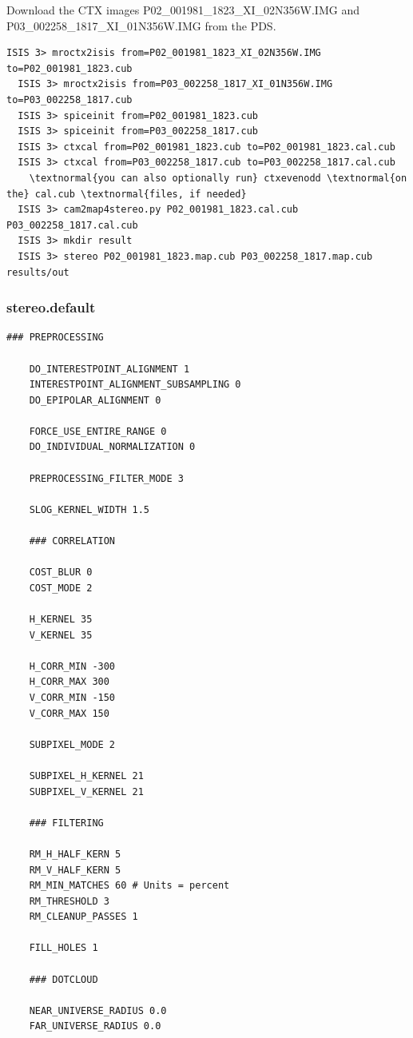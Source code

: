 Download the \ac{CTX} images P02\_001981\_1823\_XI\_02N356W.IMG and
P03\_002258\_1817\_XI\_01N356W.IMG from the \ac{PDS}.
\begin{Verbatim}[commandchars=\\\{\}]
  ISIS 3> mroctx2isis from=P02_001981_1823_XI_02N356W.IMG to=P02_001981_1823.cub
  ISIS 3> mroctx2isis from=P03_002258_1817_XI_01N356W.IMG to=P03_002258_1817.cub
  ISIS 3> spiceinit from=P02_001981_1823.cub
  ISIS 3> spiceinit from=P03_002258_1817.cub
  ISIS 3> ctxcal from=P02_001981_1823.cub to=P02_001981_1823.cal.cub
  ISIS 3> ctxcal from=P03_002258_1817.cub to=P03_002258_1817.cal.cub
    \textnormal{you can also optionally run} ctxevenodd \textnormal{on the} cal.cub \textnormal{files, if needed}
  ISIS 3> cam2map4stereo.py P02_001981_1823.cal.cub P03_002258_1817.cal.cub
  ISIS 3> mkdir result
  ISIS 3> stereo P02_001981_1823.map.cub P03_002258_1817.map.cub results/out
\end{Verbatim}

\vfill

\subsubsection*{stereo.default}

\begin{center}\begin{minipage}{5.5in}
\begin{Verbatim}[frame=single,fontsize=\small,label=stereo.default for CTX North Terra Meridiani]
    ### PREPROCESSING

    DO_INTERESTPOINT_ALIGNMENT 1
    INTERESTPOINT_ALIGNMENT_SUBSAMPLING 0
    DO_EPIPOLAR_ALIGNMENT 0

    FORCE_USE_ENTIRE_RANGE 0
    DO_INDIVIDUAL_NORMALIZATION 0

    PREPROCESSING_FILTER_MODE 3

    SLOG_KERNEL_WIDTH 1.5

    ### CORRELATION

    COST_BLUR 0
    COST_MODE 2

    H_KERNEL 35
    V_KERNEL 35

    H_CORR_MIN -300
    H_CORR_MAX 300
    V_CORR_MIN -150
    V_CORR_MAX 150

    SUBPIXEL_MODE 2

    SUBPIXEL_H_KERNEL 21
    SUBPIXEL_V_KERNEL 21

    ### FILTERING

    RM_H_HALF_KERN 5
    RM_V_HALF_KERN 5
    RM_MIN_MATCHES 60 # Units = percent
    RM_THRESHOLD 3
    RM_CLEANUP_PASSES 1

    FILL_HOLES 1

    ### DOTCLOUD

    NEAR_UNIVERSE_RADIUS 0.0
    FAR_UNIVERSE_RADIUS 0.0
\end{Verbatim}
\end{minipage}\end{center}

